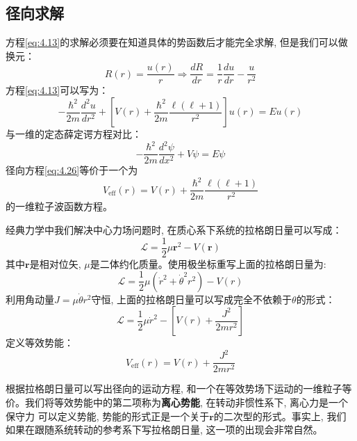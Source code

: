 \documentclass[a4paper,zihao=-4,linespread=1]{ctexrep}
\newenvironment{lequation}{\large\begin{equation}}{\end{equation}}
\begin{document}
    \subsection*{径向求解}
    方程\ref{eq:4.13}的求解必须要在知道具体的势函数后才能完全求解, 但是我们可以做换元：
    \[R(r)=\frac{u(r)}{r}\Rightarrow \frac{dR}{dr}=\frac{1}{r}\frac{du}{dr}-\frac{u}{r^2}\]
    方程\ref{eq:4.13}可以写为：
    \begin{lequation}
        \label{eq:4.26}
        \boxed{
            -\frac{\hbar^2}{2m}\frac{d^2u}{dr^2}+\left[V(r)+\frac{\hbar^2}{2m}\frac{\ell\left(\ell+1\right)}{r^2}\right]u(r)=Eu(r)
        }
    \end{lequation}
    与一维的定态薛定谔方程对比：
    \[-\frac{\hbar^2}{2m}\frac{d^2\psi}{dx^2}+V\psi=E\psi\]
    径向方程\ref{eq:4.26}等价于一个为
    \begin{equation}
        \label{eq:4.27}
        V_{\text{eff}}(r)=V(r)+\frac{\hbar^2}{2m}\frac{\ell\left(\ell+1\right)}{r^2}
    \end{equation}
   的一维粒子波函数方程。
    
    经典力学中我们解决中心力场问题时, 在质心系下系统的拉格朗日量可以写成：
    \[\mathcal{L}=\frac{1}{2}\mu\bm{r}^2-V(\bm{r})\]
    其中$\bm{r}$是相对位矢, $\mu$是二体约化质量。使用极坐标重写上面的拉格朗日量为:
    \[\mathcal{L}=\frac{1}{2}\mu\left(\dot{r}^2+\dot{\theta}^2r^2\right)-V({r})\]
    利用角动量$J=\mu\dot{\theta}r^2$守恒, 上面的拉格朗日量可以写成完全不依赖于$\theta$的形式：
    \[\mathcal{L}=\frac{1}{2}\mu\dot{r}^2-\left[V({r})+\frac{J^2}{2mr^2}\right]\]
    定义等效势能：
    \[V_{\text{eff}}(r)=V(r)+\frac{J^2}{2mr^2}\]
    
    根据拉格朗日量可以写出径向的运动方程, 和一个在等效势场下运动的一维粒子等价。我们将等效势能中的第二项称为\textbf{离心势能}, 在转动非惯性系下, 离心力是一个保守力
    可以定义势能, 势能的形式正是一个关于$\bm{r}$的二次型的形式。事实上, 我们如果在跟随系统转动的参考系下写拉格朗日量, 这一项的出现会非常自然。
    
\end{document}

